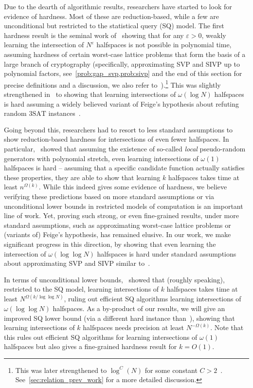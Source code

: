 \documentclass{theoretics}
\let\epsilon=\varepsilon
\newcommand{\e}{\epsilon}
\begin{document}
Due to the dearth of algorithmic results, researchers have started to look for evidence of hardness.
Most of these are reduction-based, while a few are unconditional but restricted to the statistical query (SQ) model.
The first hardness result is the seminal work of~\cite{klivans2009cryptographic} showing that for any $\e > 0$, weakly learning the intersection of $N^\e$ halfspaces is not possible in polynomial time, assuming hardness of certain worst-case lattice problems that form the basis of a large branch of cryptography (specifically, approximating SVP and SIVP up to polynomial factors, see~\cref{prob:gap_svp,prob:sivp} and the end of this section for precise definitions and a discussion, we also refer to~\cite{peikert2016decade}).\footnote{This was later strengthened to $\log^C (N)$ for some  constant $C > 2$~\cite{klivans2006cryptographic}. See~\cref{sec:relation_prev_work} for a more detailed discussion.}
This was slightly strengthened in~\cite{daniely2016complexity} to showing that learning intersections of $\omega(\log N)$ halfspaces is hard assuming a widely believed variant of Feige's hypothesis about refuting random 3$\mathrm{SAT}$ instances~\cite{MR2121179-Feige02}.

Going beyond this, researchers had to resort to less standard assumptions to show reduction-based hardness for intersections of even fewer halfspaces.
In particular,~\cite{daniely2021local} showed that assuming the existence of so-called \emph{local} pseudo-random generators with polynomial stretch, even learning intersections of $\omega(1)$ halfspaces is hard -- assuming that a specific candidate function actually satisfies these properties, they are able to show that learning $k$ halfspaces takes time at least $n^{\Omega(k)}$.
While this indeed gives some evidence of hardness, we believe verifying these predictions based on more standard assumptions or via unconditional lower bounds in restricted models of computation is an important line of work.
Yet, proving such strong, or even fine-grained results, under more standard assumptions, such as approximating worst-case lattice problems or (variants of) Feige's hypothesis, has remained elusive.
In our work, we make significant progress in this direction, by showing that even learning the intersection of $\omega(\log \log N)$ halfspaces is hard under standard assumptions about approximating SVP and SIVP similar to~\cite{klivans2009cryptographic}.

In terms of unconditional lower bounds,~\cite{klivans2007unconditional} showed that (roughly speaking), restricted to the SQ model, learning intersections of $k$ halfspaces takes time at least $N^{\Omega(k/\log\log N)}$, ruling out efficient SQ algorithms learning intersections of $\omega(\log \log N)$ halfspaces.
As a by-product of our results, we will give an improved SQ lower bound (via a different hard instance than~\cite{klivans2007unconditional}), showing that learning intersections of $k$ halfspaces needs precision at least $N^{-\Omega(k)}$.
Note that this rules out efficient SQ algorithms for learning intersections of $\omega(1)$ halfspaces but also gives a fine-grained hardness result for $k = O(1)$.
\end{document}
